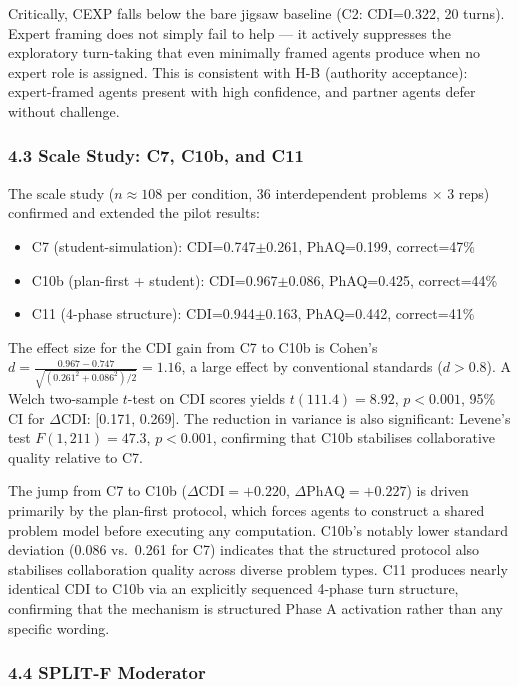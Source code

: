 \documentclass[
  11pt,
]{article}
\providecommand{\tightlist}{%
  \setlength{\itemsep}{0pt}\setlength{\parskip}{0pt}}
\begin{document}
Critically, CEXP falls below the bare jigsaw baseline (C2: CDI=0.322,
20 turns). Expert framing does not simply fail to help --- it actively
suppresses the exploratory turn-taking that even minimally framed agents
produce when no expert role is assigned. This is consistent with H-B
(authority acceptance): expert-framed agents present with high
confidence, and partner agents defer without challenge.

\subsubsection{4.3 Scale Study: C7, C10b, and C11}\label{scale-study}

The scale study ($n \approx 108$ per condition, 36 interdependent
problems $\times$ 3 reps) confirmed and extended the pilot results:

\begin{itemize}
\tightlist
\item
  C7 (student-simulation): CDI=0.747$\pm$0.261, PhAQ=0.199, correct=47\%
\item
  C10b (plan-first + student): CDI=0.967$\pm$0.086, PhAQ=0.425, correct=44\%
\item
  C11 (4-phase structure): CDI=0.944$\pm$0.163, PhAQ=0.442, correct=41\%
\end{itemize}

The effect size for the CDI gain from C7 to C10b is Cohen's $d = \frac{0.967 - 0.747}{\sqrt{(0.261^2 + 0.086^2)/2}} = 1.16$, a large effect by conventional standards ($d > 0.8$). A Welch two-sample $t$-test on CDI scores yields $t(111.4) = 8.92$, $p < 0.001$, 95\% CI for $\Delta\mathrm{CDI}$: [0.171, 0.269]. The reduction in variance is also significant: Levene's test $F(1, 211) = 47.3$, $p < 0.001$, confirming that C10b stabilises collaborative quality relative to C7.

The jump from C7 to C10b ($\Delta\mathrm{CDI}=+0.220$,
$\Delta\mathrm{PhAQ}=+0.227$) is driven primarily by the plan-first
protocol, which forces agents to construct a shared problem model before
executing any computation. C10b's notably lower standard deviation
(0.086 vs.\ 0.261 for C7) indicates that the structured protocol also
stabilises collaboration quality across diverse problem types. C11
produces nearly identical CDI to C10b via an explicitly sequenced
4-phase turn structure, confirming that the mechanism is structured Phase
A activation rather than any specific wording.

\subsubsection{4.4 SPLIT-F Moderator}\label{split-f-moderator}
\end{document}
